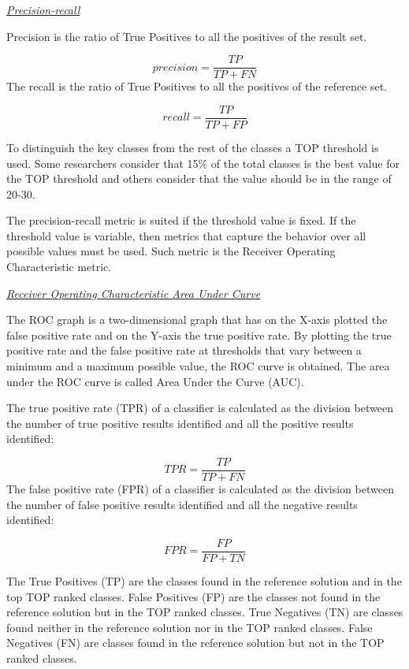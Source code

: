 \underline{\textit{Precision-recall}}


\hspace{-4em}Precision is the ratio of True Positives to all the positives of the result set.

\begin{equation}
 precision = \frac{TP}{TP+FN}
\end{equation}
The recall is the ratio of True Positives to all the positives of the reference set.

\begin{equation}
 recall = \frac{TP}{TP+FP}
\end{equation}

To distinguish the key classes from the rest of the classes a TOP threshold is used. Some researchers consider that 15\% of the total classes is the best value for the TOP threshold and others consider that the value should be in the range of 20-30. 

The precision-recall metric is suited if the threshold value is fixed. If the threshold value is variable, then metrics that capture the behavior over all possible values must be used. Such metric is the Receiver Operating Characteristic metric.

\underline{\textit{Receiver Operating Characteristic Area Under Curve}}


The ROC graph is a two-dimensional graph that has on the X-axis plotted the false positive rate and on the Y-axis the true positive rate. By plotting the true positive rate and the false positive rate at thresholds that vary between a minimum and a maximum possible value, the ROC curve is obtained. The area under the ROC curve is called Area Under the Curve (AUC).

The true positive rate (TPR) of a classifier is calculated as the division between the number of true positive results identified and all the positive results identified:

\begin{equation}
TPR = \frac{TP}{TP+FN}
\end{equation}
The false positive rate (FPR) of a classifier is calculated as the division between the number of false positive results identified and all the negative results identified:

\begin{equation}
FPR = \frac{FP}{FP+TN}
\end{equation}


The True Positives (TP) are the classes found in the reference solution and in the top TOP ranked classes. False Positives (FP) are the classes not found in the reference solution but in the TOP ranked classes.
True Negatives (TN) are classes found neither in the reference solution nor in the TOP ranked classes. False Negatives (FN) are classes found in the reference solution but not in the TOP ranked classes.

